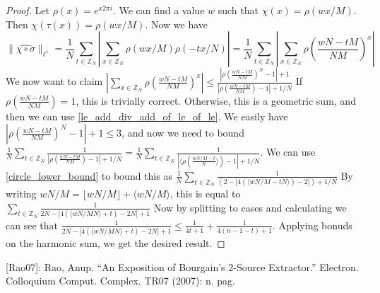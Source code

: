 \begin{proof}
    \leanok
    Let $\rho(x) = e^{x 2\pi i}$. We can find a value $w$ such that $\chi(x) = \rho(w x / M)$. Then $\chi(\tau(x)) = \rho(w x / M)$.
    Now we have
    $$\lVert \widehat{\chi \circ \sigma}\rVert_{\ell^1} = \frac{1}{N} \sum_{t \in \mathbb{Z}_N} |\sum_{x \in \mathbb{Z}_N} \rho(w x / M) \rho(- tx/N)| =
    \frac{1}{N} \sum_{t \in \mathbb{Z}_N} |\sum_{x \in \mathbb{Z}_N} \rho(\frac{w N - t M}{N M})^x|$$
    We now want to claim $|\sum_{x \in \mathbb{Z}_N} \rho(\frac{w N - t M}{N M})^x| \leq
        \frac{|\rho(\frac{w N - t M}{N M})^N - 1| + 1}{|\rho(\frac{w N - t M}{N M}) - 1| + 1/N}$
    If $\rho(\frac{w N - t M}{N M}) = 1$, this is trivially correct. Otherwise, this is a geometric sum, and then we can use
    \ref{le_add_div_add_of_le_of_le}.
    We easily have $|\rho(\frac{w N - t M}{N M})^N - 1| + 1 \leq 3$, and now we need to bound
    $\frac1N\sum_{t \in \mathbb{Z}_N} \frac1{|\rho(\frac{w N - t M}{N M}) - 1| + 1/N} = \frac1N\sum_{t \in \mathbb{Z}_N} \frac1{|\langle\rho(\frac{w N / M - t}{N}\rangle) - 1| + 1/N}$.
    We can use \ref{circle_lower_bound} to bound this as $\frac1N\sum_{t \in \mathbb{Z}_N} \frac1{(2 - |4(\langle{w N / M - t}{N}\rangle) - 2|) + 1/N}$
    By writing $w N / M = \lfloor w N / M \rfloor + \langle w N / M \rangle$, this is equal to
    $\sum_{t \in \mathbb{Z}_N} \frac1{2N - |4(\langle{w N / M}{N}\rangle + t) - 2N| + 1}$
    Now by splitting to cases and calculating we can see that $\frac1{2N - |4(\langle{w N / M}{N}\rangle + t) - 2N| + 1} \leq \frac1{4t+1} + \frac1{4(n-1-t)+1}$.
    Applying bonuds on the harmonic sum, we get the desired result.
\end{proof}

[Rao07]: Rao, Anup. “An Exposition of Bourgain's 2-Source Extractor.” Electron. Colloquium Comput. Complex. TR07 (2007): n. pag.